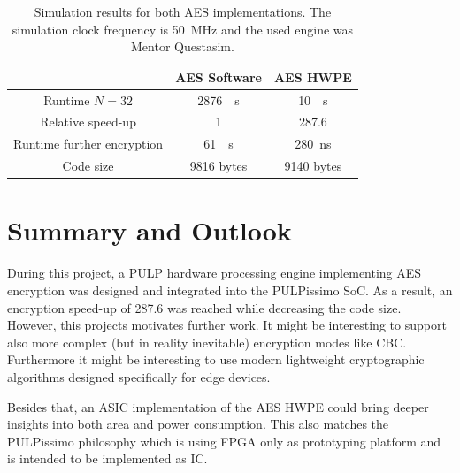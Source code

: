 \documentclass[a4paper, 12pt]{article}
\begin{document}
\begin{table}[h]
    \centering
    \begin{tabular}{c|c c}
        \toprule
         &  AES Software & AES HWPE  \\
        \midrule
		Runtime $N=32$ & \SI{2876}{\mu s} & \SI{10}{\mu s} \\
		Relative speed-up & 1 & 287.6 \\
		Runtime further encryption & \SI{61}{\mu s} & \SI{280}{ns} \\
		Code size & 9816 bytes & 9140 bytes\\
        \bottomrule
    \end{tabular}
	\label{tab:results}
	\caption{Simulation results for both AES implementations. The simulation clock frequency is \SI{50}{MHz} and the used engine was Mentor Questasim.}
\end{table}

\section{Summary and Outlook} \label{sec:summary}

During this project, a PULP hardware processing engine implementing AES encryption was designed and integrated into the PULPissimo SoC. As a result, an encryption speed-up of 287.6 was reached while decreasing the code size. However, this projects motivates further work. It might be interesting to support also more complex (but in reality inevitable) encryption modes like CBC. Furthermore it might be interesting to use modern lightweight cryptographic algorithms designed specifically for edge devices.

Besides that, an ASIC implementation of the AES HWPE could bring deeper insights into both area and power consumption. This also matches the PULPissimo philosophy which is using FPGA only as prototyping platform and is intended to be implemented as IC.

\clearpage
\sloppy
\printbibliography
\end{document}
